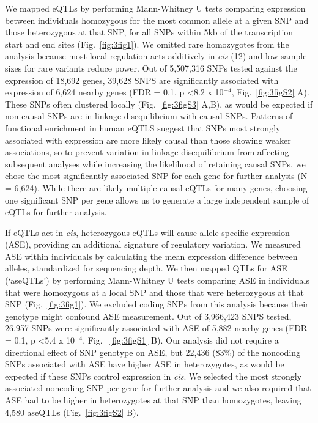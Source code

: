 We mapped eQTLs by performing Mann-Whitney U tests comparing expression between individuals homozygous for the most common allele at a given SNP and those heterozygous at that SNP, for all SNPs within 5kb of the transcription start and end sites (Fig.~\ref{fig:3fig1}). We omitted rare homozygotes from the analysis because most local regulation acts additively in \textit{cis} (12) and low sample sizes for rare variants reduce power. Out of 5,507,316 SNPs tested against the expression of 18,692 genes, 39,628 SNPS are significantly associated with expression of 6,624 nearby genes (FDR = 0.1, p \textless 8.2 x 10$^{-4}$, Fig.~\ref{fig:3figS2} A). These SNPs often clustered locally (Fig.~\ref{fig:3figS3} A,B), as would be expected if non-causal SNPs are in linkage disequilibrium with causal SNPs. Patterns of functional enrichment in human eQTLS suggest that SNPs most strongly associated with expression are more likely causal than those showing weaker associations\citep{Lappalainen2013-jh}, so to prevent variation in linkage disequilibrium from affecting subsequent analyses while increasing the likelihood of retaining causal SNPs, we chose the most significantly associated SNP for each gene for further analysis (N = 6,624). While there are likely multiple causal eQTLs for many genes, choosing one significant SNP per gene allows us to generate a large independent sample of eQTLs for further analysis.

If eQTLs act in \textit{cis}, heterozygous eQTLs will cause allele-specific expression (ASE), providing an additional signature of regulatory variation. We measured ASE within individuals by calculating the mean expression difference between alleles, standardized for sequencing depth. We then mapped QTLs for ASE (‘aseQTLs’) by performing Mann-Whitney U tests comparing ASE in individuals that were homozygous at a local SNP and those that were heterozygous at that SNP (Fig.~\ref{fig:3fig1}). We excluded coding SNPs from this analysis because their genotype might confound ASE measurement. Out of 3,966,423 SNPS tested, 26,957 SNPs were significantly associated with ASE of 5,882 nearby genes (FDR = 0.1, p \textless 5.4 x 10$^{-4}$, Fig. ~\ref{fig:3figS1} B). Our analysis did not require a directional effect of SNP genotype on ASE, but 22,436 (83\%) of the noncoding SNPs associated with ASE have higher ASE in heterozygotes, as would be expected if these SNPs control expression in \textit{cis}. We selected the most strongly associated noncoding SNP per gene for further analysis and we also required that ASE had to be higher in heterozygotes at that SNP than homozygotes, leaving 4,580 aseQTLs (Fig.~\ref{fig:3figS2} B). 

